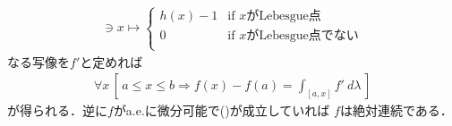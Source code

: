 \begin{sketch}
\begin{description}
				\begin{align}
					[a,b] \ni x \longmapsto
					\begin{cases}
						h(x) - 1 & \mbox{if $x$がLebesgue点} \\
						0 & \mbox{if $x$がLebesgue点でない} \\
					\end{cases}
				\end{align}
				なる写像を$f'$と定めれば
				\begin{align}
					\forall x\, \left[\, a \leq x \leq b \Longrightarrow f(x) - f(a) = \int_{[a,x]} f'\ d\lambda\, \right]
					\label{fom:the_fundamental_theorem_of_calculus}
				\end{align}
				が得られる．逆に$f$がa.e.に微分可能で()が成立していれば
				$f$は絶対連続である．
		\end{description}
	\end{sketch}